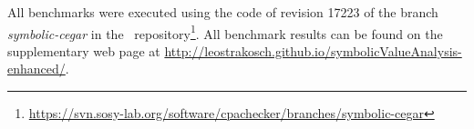 All benchmarks were executed using the code of revision 17223 of the branch \emph{symbolic-cegar} in the
\cpaChecker\ repository\footnote{\url{https://svn.sosy-lab.org/software/cpachecker/branches/symbolic-cegar}}.
All benchmark results can be found on the supplementary web page at \url{http://leostrakosch.github.io/symbolicValueAnalysis-enhanced/}.
